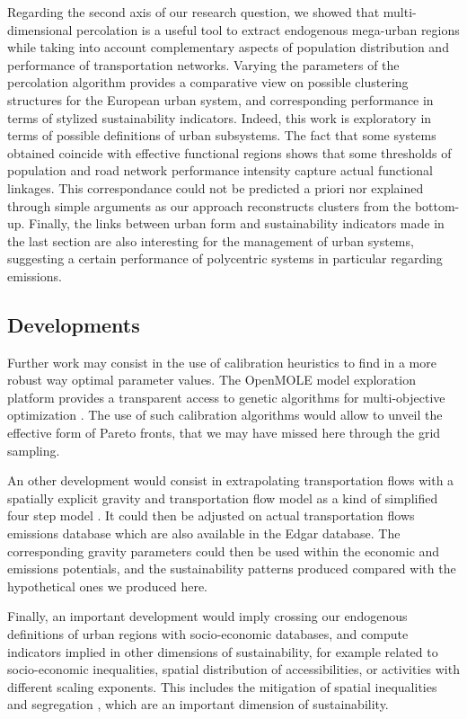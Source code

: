 \documentclass{jimis-en}
\begin{document}
Regarding the second axis of our research question, we showed that multi-dimensional percolation is a useful tool to extract endogenous mega-urban regions while taking into account complementary aspects of population distribution and performance of transportation networks. Varying the parameters of the percolation algorithm provides a comparative view on possible clustering structures for the European urban system, and corresponding performance in terms of stylized sustainability indicators. Indeed, this work is exploratory in terms of possible definitions of urban subsystems. The fact that some systems obtained coincide with effective functional regions \citep{hall2006polycentric} shows that some thresholds of population and road network performance intensity capture actual functional linkages. This correspondance could not be predicted a priori nor explained through simple arguments as our approach reconstructs clusters from the bottom-up. Finally, the links between urban form and sustainability indicators made in the last section are also interesting for the management of urban systems, suggesting a certain performance of polycentric systems in particular regarding emissions.


\subsection{Developments}

Further work may consist in the use of calibration heuristics to find in a more robust way optimal parameter values. The OpenMOLE model exploration platform provides a transparent access to genetic algorithms for multi-objective optimization \citep{reuillon2013openmole}. The use of such calibration algorithms would allow to unveil the effective form of Pareto fronts, that we may have missed here through the grid sampling.


An other development would consist in extrapolating transportation flows with a spatially explicit gravity and transportation flow model as a kind of simplified four step model \citep{mcnally2000four}. It could then be adjusted on actual transportation flows emissions database which are also available in the Edgar database. The corresponding gravity parameters could then be used within the economic and emissions potentials, and the sustainability patterns produced compared with the hypothetical ones we produced here.

Finally, an important development would imply crossing our endogenous definitions of urban regions with socio-economic databases, and compute indicators implied in other dimensions of sustainability, for example related to socio-economic inequalities, spatial distribution of accessibilities, or activities with different scaling exponents. This includes the mitigation of spatial inequalities and segregation \citep{tammaru2015multi}, which are an important dimension of sustainability.
\end{document}
